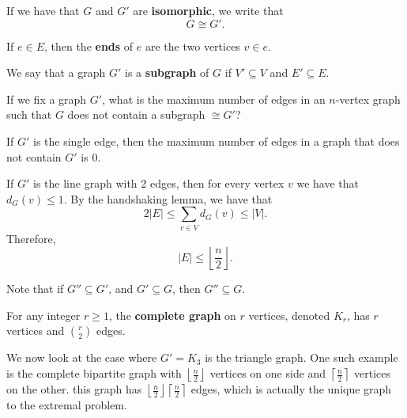 
\begin{definition}
	If we have that \( G \) and \( G' \) are \textbf{isomorphic}, we write that \[
		G \cong G'
	.\] 
\end{definition}

\begin{definition}
	If \( e \in E \), then the \textbf{ends} of \( e \) are the two vertices \( v \in e \).
\end{definition}

\begin{definition}
	We say that a graph \( G' \) is a \textbf{subgraph} of \( G \) if \( V' \subseteq V \) and \( E' \subseteq E \).
\end{definition}

If we fix a graph \( G' \), what is the maximum number of edges in an \( n \)-vertex graph such that \( G \) does not contain a subgraph \( \cong G' \)?

\begin{eg}
	If \( G' \) is the single edge, then the maximum number of edges in a graph that does not contain \( G' \) is 0.
\end{eg}

\begin{eg}
	If \( G' \) is the line graph with 2 edges, then for every vertex \( v \) we have that \( d_G(v) \le 1 \). By the handshaking lemma, we have that \[
		2|E| \le \sum_{v \in V}d_G(v) \le |V|
	.\] Therefore, \[
		|E| \le \left\lfloor \frac{n}{2} \right\rfloor
	.\] 
\end{eg}

\begin{observation}
	Note that if \( G'' \subseteq G' \), and \( G'\subseteq G \), then \( G'' \subseteq G \).
\end{observation}

\begin{definition}
	For any integer \( r\ge 1 \), the \textbf{complete graph} on \( r \) vertices, denoted \( K_r \), has \( r \) vertices and \( \binom{r}{2} \) edges.
\end{definition}

We now look at the case where \( G'=K_3 \) is the triangle graph. One such example is the complete bipartite graph with \( \left\lfloor \frac{n}{2} \right\rfloor \) vertices on one side and \( \left\lceil \frac{n}{2} \right\rceil  \) vertices on the other. this graph has \( \left\lfloor \frac{n}{2} \right\rfloor \left\lceil \frac{n}{2} \right\rceil \) edges, which is actually the unique graph to the extremal problem.

